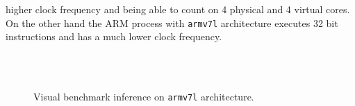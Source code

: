 higher clock frequency and being able to count on 4 physical and 4 virtual
cores. 
On the other hand the ARM process with \texttt{armv7l} architecture executes 32
bit instructions and has a much lower clock frequency.
%
\begin{figure}[htb]
	\centering
	 \\
	 \\
	\caption{Visual benchmark inference on \texttt{armv7l} architecture.}
	\label{fig:armv7l-bench}
\end{figure}
%